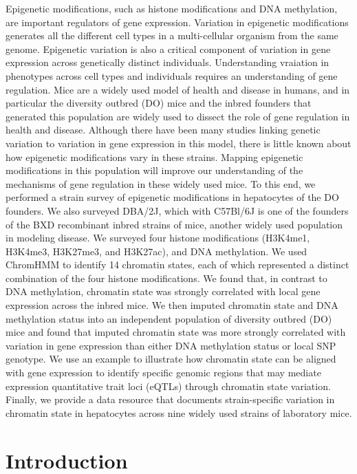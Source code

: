 \documentclass[
  11pt,
]{article}
\begin{document}
Epigenetic modifications, such as histone modifications and DNA
methylation, are important regulators of gene expression. Variation in
epigenetic modifications generates all the different cell types in a
multi-cellular organism from the same genome. Epigenetic variation is
also a critical component of variation in gene expression across
genetically distinct individuals. Understanding vraiation in phenotypes
across cell types and individuals requires an understanding of gene
regulation. Mice are a widely used model of health and disease in
humans, and in particular the diversity outbred (DO) mice and the inbred
founders that generated this population are widely used to dissect the
role of gene regulation in health and disease. Although there have been
many studies linking genetic variation to variation in gene expression
in this model, there is little known about how epigenetic modifications
vary in these strains. Mapping epigenetic modifications in this
population will improve our understanding of the mechanisms of gene
regulation in these widely used mice. To this end, we performed a strain
survey of epigenetic modifications in hepatocytes of the DO founders. We
also surveyed DBA/2J, which with C57Bl/6J is one of the founders of the
BXD recombinant inbred strains of mice, another widely used population
in modeling disease. We surveyed four histone modifications (H3K4me1,
H3K4me3, H3K27me3, and H3K27ac), and DNA methylation. We used ChromHMM
to identify 14 chromatin states, each of which represented a distinct
combination of the four histone modifications. We found that, in
contrast to DNA methylation, chromatin state was strongly correlated
with local gene expression across the inbred mice. We then imputed
chromatin state and DNA methylation status into an independent
population of diversity outbred (DO) mice and found that imputed
chromatin state was more strongly correlated with variation in gene
expression than either DNA methylation status or local SNP genotype. We
use an example to illustrate how chromatin state can be aligned with
gene expression to identify specific genomic regions that may mediate
expression quantitative trait loci (eQTLs) through chromatin state
variation. Finally, we provide a data resource that documents
strain-specific variation in chromatin state in hepatocytes across nine
widely used strains of laboratory mice.

\hypertarget{introduction}{%
\section{Introduction}\label{introduction}}
\end{document}
